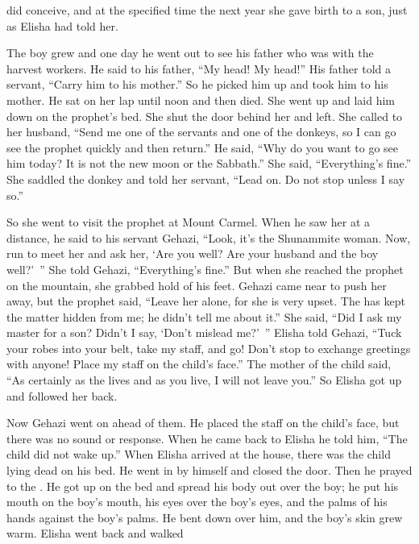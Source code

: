 {did conceive,
and at
the specified
time
the next year she gave birth
to a son,
just
as Elisha
had told
her.
\par }{\PP {}The boy
grew
and one day
he went out
to
see his father
who was with the harvest workers.
He said
to
his father,
“My head! My head!” His father told
a servant,
“Carry
him to
his mother.”
So he picked
him up
and took
him to
his mother.
He sat
on
her lap
until
noon
and then died.
She
went up
and laid
him down
on
the prophet’s
bed.
She shut
the door behind
her and left.
She called
to
her husband,
“Send
me
one
of the servants
and one
of the donkeys,
so
I can go see
the prophet
quickly
and then return.”
He said,
“Why
do you
want to go
see him
today? It is not
the new moon
or
the Sabbath.”
She said,
“Everything’s fine.”
She saddled
the donkey
and told
her
servant,
“Lead
on.
Do not
stop unless
I say so.”
\par }{\PP {}So she went
to visit
the prophet
at Mount
Carmel.
When
he saw
her at a distance,
he said
to
his servant
Gehazi,
“Look,
it’s
the Shunammite woman.
Now,
run
to meet
her and ask
her, ‘Are you well? Are your husband
and the boy
well?’ ” She told
Gehazi, “Everything’s fine.”
But when she reached
the prophet
on
the mountain,
she grabbed hold
of his feet.
Gehazi
came near
to push
her away,
but the prophet
said,
“Leave
her alone,
for
she is very upset.
The
{}
has kept the matter hidden
from
me; he didn’t
tell me about it.”
She said,
“Did I ask
my master
for a son? Didn’t
I say, ‘Don’t mislead me?’ ”
Elisha told
Gehazi,
“Tuck
your robes into your belt,
take
my staff,
and go! Don’t
stop to exchange greetings with anyone! Place
my staff
on
the child’s
face.”
The mother
of the child
said,
“As certainly as the
{}
lives
and as you live,
I will not leave
you.” So Elisha got
up and followed
her back.
\par }{\PP {}Now Gehazi
went on
ahead
of them. He placed
the staff
on
the child’s
face,
but there was no
sound
or
response.
When
he came
back
to Elisha
he told
him, “The child
did not
wake up.”
When Elisha
arrived
at the house,
there
was the child
lying
dead
on
his bed.
He went
in by himself
and closed
the door.
Then he prayed
to
the {}.
He got up
on
the bed
and spread his body out over
the boy;
he put
his mouth
on
the boy’s mouth,
his eyes
over
the boy’s eyes,
and the palms
of his hands against
the boy’s palms.
He bent
down over him,
and the boy’s
skin
grew warm.
Elisha went back
and walked
}
